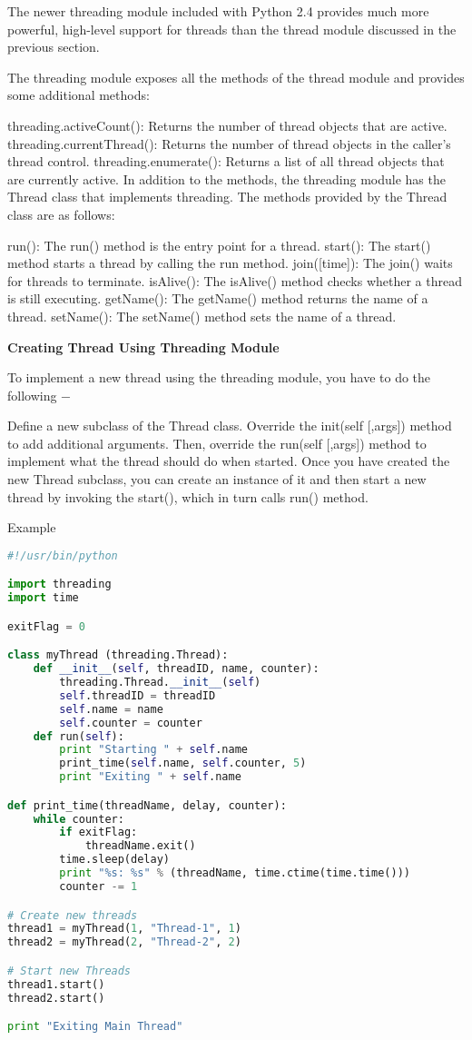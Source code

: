 The newer threading module included with Python 2.4 provides much more powerful, high-level support for threads than the thread module discussed in the previous section.

The threading module exposes all the methods of the thread module and provides some additional methods:

threading.activeCount(): Returns the number of thread objects that are active.
threading.currentThread(): Returns the number of thread objects in the caller's thread control.
threading.enumerate(): Returns a list of all thread objects that are currently active.
In addition to the methods, the threading module has the Thread class that implements threading. The methods provided by the Thread class are as follows:

run(): The run() method is the entry point for a thread.
start(): The start() method starts a thread by calling the run method.
join([time]): The join() waits for threads to terminate.
isAlive(): The isAlive() method checks whether a thread is still executing.
getName(): The getName() method returns the name of a thread.
setName(): The setName() method sets the name of a thread.

\textbf{Creating Thread Using Threading Module}

To implement a new thread using the threading module, you have to do the following −

Define a new subclass of the Thread class.
Override the init(self [,args]) method to add additional arguments.
Then, override the run(self [,args]) method to implement what the thread should do when started.
Once you have created the new Thread subclass, you can create an instance of it and then start a new thread by invoking the start(), which in turn calls run() method.

Example

\begin{lstlisting}[language=Python]
#!/usr/bin/python

import threading
import time

exitFlag = 0

class myThread (threading.Thread):
    def __init__(self, threadID, name, counter):
        threading.Thread.__init__(self)
        self.threadID = threadID
        self.name = name
        self.counter = counter
    def run(self):
        print "Starting " + self.name
        print_time(self.name, self.counter, 5)
        print "Exiting " + self.name

def print_time(threadName, delay, counter):
    while counter:
        if exitFlag:
            threadName.exit()
        time.sleep(delay)
        print "%s: %s" % (threadName, time.ctime(time.time()))
        counter -= 1

# Create new threads
thread1 = myThread(1, "Thread-1", 1)
thread2 = myThread(2, "Thread-2", 2)

# Start new Threads
thread1.start()
thread2.start()

print "Exiting Main Thread"
\end{lstlisting}

